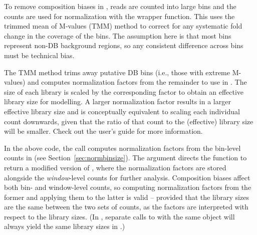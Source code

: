 \documentclass{report}\usepackage[]{graphicx}\usepackage[usenames,dvipsnames]{color}
\newcommand{\hlnum}[1]{\textcolor[rgb]{0.816,0.125,0.439}{#1}}%
\newcommand{\hlopt}[1]{\textcolor[rgb]{0,0,0}{#1}}%
\newcommand{\hlstd}[1]{\textcolor[rgb]{0.251,0.251,0.251}{#1}}%
\newcommand{\hlkwb}[1]{\textcolor[rgb]{0,0,0}{#1}}%
\newcommand{\hlkwc}[1]{\textcolor[rgb]{0.251,0.251,0.251}{#1}}%
\newcommand{\hlkwd}[1]{\textcolor[rgb]{0.878,0.439,0.125}{#1}}%
\newenvironment{knitrout}{}{} %
\begin{document}
To remove composition biases in , reads are counted into large bins and the counts are used for normalization with the  wrapper function.
This uses the trimmed mean of M-values (TMM) method \cite{oshlack2010} to correct for any systematic fold change in the coverage of the bins. 
The assumption here is that most bins represent non-DB background regions, so any consistent difference across bins must be technical bias.

\begin{knitrout}
\color{fgcolor}
\end{knitrout}

The TMM method trims away putative DB bins (i.e., those with extreme M-values) and computes normalization factors from the remainder to use in . 
The size of each library is scaled by the corresponding factor to obtain an effective library size for modelling. 
A larger normalization factor results in a larger effective library size and is conceptually equivalent to scaling each individual count downwards, given that the ratio of that count to the (effective) library size will be smaller. 
Check out the  user's guide for more information.

In the above code, the  call computes normalization factors from the bin-level counts in  (see Section~\ref{sec:normbinsize}).
The  argument directs the function to return a modified version of , where the normalization factors are stored alongside the \textit{window}-level counts for further analysis.
Composition biases affect both bin- and window-level counts, so computing normalization factors from the former and applying them to the latter is valid -- provided that the library sizes are the same between the two sets of counts, as the factors are interpreted with respect to the library sizes.
(In , separate calls to  with the same  object will always yield the same library sizes in .)
\end{document}
